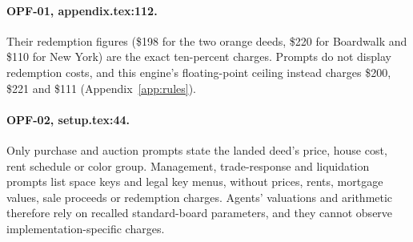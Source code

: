 
\paragraph{OPF-01, appendix.tex:112.}
Their redemption figures (\$198 for the two orange deeds, \$220 for Boardwalk and \$110 for New York) are the exact ten-percent charges. Prompts do not display redemption costs, and this engine's floating-point ceiling instead charges \$200, \$221 and \$111 (Appendix~\ref{app:rules}).

\paragraph{OPF-02, setup.tex:44.}
Only purchase and auction prompts state the landed deed's price, house cost, rent schedule or color group. Management, trade-response and liquidation prompts list space keys and legal key menus, without prices, rents, mortgage values, sale proceeds or redemption charges. Agents' valuations and arithmetic therefore rely on recalled standard-board parameters, and they cannot observe implementation-specific charges.

